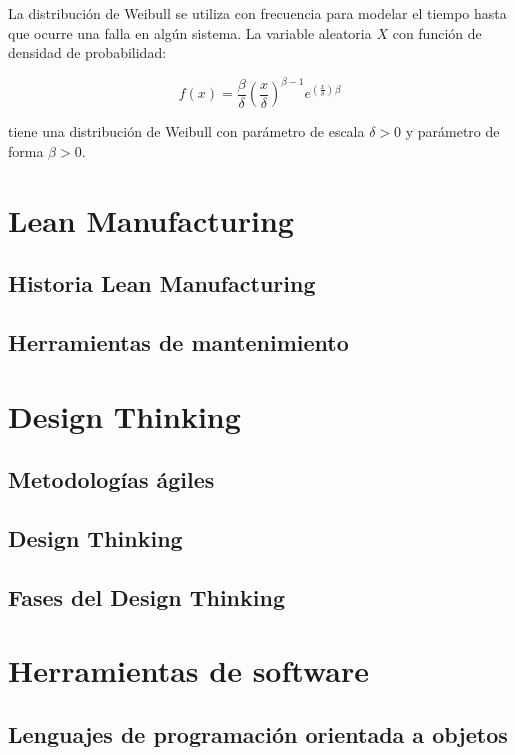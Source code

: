 La distribución de Weibull se utiliza con frecuencia para modelar el tiempo hasta que ocurre una falla en algún sistema. La variable aleatoria $X$ con función de densidad de probabilidad:

\begin{equation*}
f(x)=\frac{\beta}{\delta}\left( \frac{x}{\delta} \right)^{\beta-1}e^{\left( \frac{x}{\delta} \right)}{}^\beta
\end{equation*}

tiene una distribución de Weibull con parámetro de escala $\delta>0$ y parámetro de forma $\beta>0$.


\section{Lean Manufacturing}

\subsection{Historia Lean Manufacturing}

\subsection{Herramientas de mantenimiento}

\section{Design Thinking}

\subsection{Metodologías ágiles}

\subsection{Design Thinking}

\subsection{Fases del Design Thinking}


\section{Herramientas de software}

\subsection{Lenguajes de programación orientada a objetos}

